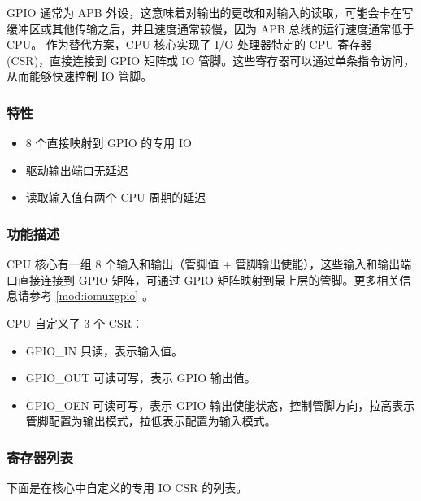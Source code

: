 \documentclass[main\_\_CN.tex]{subfiles}
\begin{document}
GPIO 通常为 APB 外设，这意味着对输出的更改和对输入的读取，可能会卡在写缓冲区或其他传输之后，并且速度通常较慢，因为 APB 总线的运行速度通常低于 CPU。
作为替代方案，CPU 核心实现了 I/O 处理器特定的 CPU 寄存器 (CSR)，直接连接到 GPIO 矩阵或 IO 管脚。这些寄存器可以通过单条指令访问，从而能够快速控制 IO 管脚。

\subsubsection{特性}
\label{sec:riscvcpu-fastio-features}
 \begin{itemize}
    \item 8 个直接映射到 GPIO 的专用 IO
    \item 驱动输出端口无延迟
    \item 读取输入值有两个 CPU 周期的延迟
\end{itemize}

\subsubsection{功能描述}
\label{sec:riscvcpu-fastio-func-descr}

CPU 核心有一组 8 个输入和输出（管脚值 + 管脚输出使能），这些输入和输出端口直接连接到 GPIO 矩阵，可通过 GPIO 矩阵映射到最上层的管脚。更多相关信息请参考 \ref{mod:iomuxgpio} \textit{}。

CPU 自定义了 3 个 CSR：
\begin{itemize}
    \item GPIO\_IN 只读，表示输入值。
    \item GPIO\_OUT 可读可写，表示 GPIO 输出值。
    \item GPIO\_OEN 可读可写，表示 GPIO 输出使能状态，控制管脚方向，拉高表示管脚配置为输出模式，拉低表示配置为输入模式。
\end{itemize}


\newpage
\hypertarget{riscvcpu-fastio-reg-summ}{}
\subsubsection{寄存器列表}
\label{sec:riscvcpu-fastio-reg-summ}


下面是在核心中自定义的专用 IO CSR 的列表。



\end{document}
